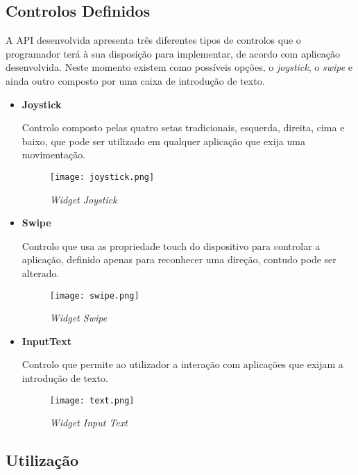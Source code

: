 \subsection{Controlos Definidos}

	A API desenvolvida apresenta três diferentes tipos de controlos que o programador terá à sua disposição para implementar, de acordo com aplicação desenvolvida. Neste momento existem como possíveis opções, o \textit{joystick}, o \textit{swipe} e ainda outro composto por uma caixa de introdução de texto.

	\begin{itemize}

	\item \textbf{Joystick}

		Controlo composto pelas quatro setas tradicionais, esquerda, direita, cima e baixo, que pode ser utilizado em qualquer aplicação que exija uma movimentação.

		\begin{figure}[ht]
		\centering
		\texttt{[image: joystick.png]}
		\caption[\textit{Widget Joystick}] {\textit{Widget Joystick}}
		\label{fig:joystick}
		\end{figure}
		

	\item \textbf{Swipe}

		Controlo que usa as propriedade touch do dispositivo para controlar a aplicação, definido apenas para reconhecer uma direção, contudo pode ser alterado.

		\begin{figure}[ht]
		\centering
		\texttt{[image: swipe.png]}
		\caption[\textit{Widget Swipe}] {\textit{Widget Swipe}}
		\label{fig:swipe}
		\end{figure}

	\item \textbf{InputText}

		Controlo que permite ao utilizador a interação com aplicações que exijam a introdução de texto.

		\begin{figure}[ht]
		\centering
		\texttt{[image: text.png]}
		\caption[\textit{Widget Input Text}] {\textit{Widget Input Text}}
		\label{fig:text}
		\end{figure}

	\end{itemize}

\subsection{Utilização}

